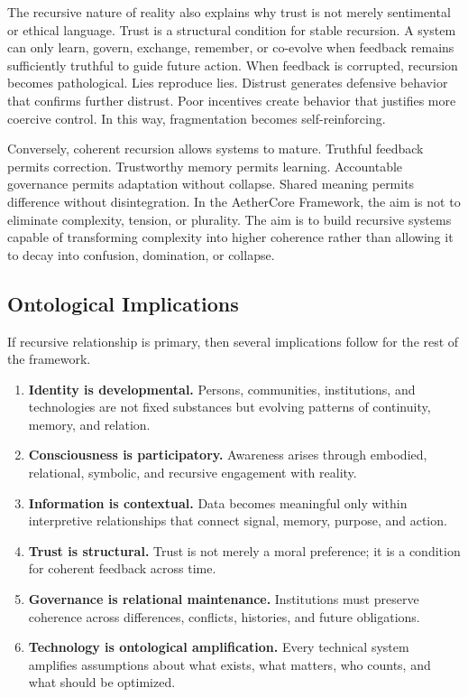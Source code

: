 \documentclass[12pt]{article}
\begin{document}
The recursive nature of reality also explains why trust is not merely sentimental or ethical language. Trust is a structural condition for stable recursion. A system can only learn, govern, exchange, remember, or co-evolve when feedback remains sufficiently truthful to guide future action. When feedback is corrupted, recursion becomes pathological. Lies reproduce lies. Distrust generates defensive behavior that confirms further distrust. Poor incentives create behavior that justifies more coercive control. In this way, fragmentation becomes self-reinforcing.

Conversely, coherent recursion allows systems to mature. Truthful feedback permits correction. Trustworthy memory permits learning. Accountable governance permits adaptation without collapse. Shared meaning permits difference without disintegration. In the AetherCore Framework, the aim is not to eliminate complexity, tension, or plurality. The aim is to build recursive systems capable of transforming complexity into higher coherence rather than allowing it to decay into confusion, domination, or collapse.

\subsection{Ontological Implications}

If recursive relationship is primary, then several implications follow for the rest of the framework.

\begin{enumerate}
  \item \textbf{Identity is developmental.} Persons, communities, institutions, and technologies are not fixed substances but evolving patterns of continuity, memory, and relation.
  \item \textbf{Consciousness is participatory.} Awareness arises through embodied, relational, symbolic, and recursive engagement with reality.
  \item \textbf{Information is contextual.} Data becomes meaningful only within interpretive relationships that connect signal, memory, purpose, and action.
  \item \textbf{Trust is structural.} Trust is not merely a moral preference; it is a condition for coherent feedback across time.
  \item \textbf{Governance is relational maintenance.} Institutions must preserve coherence across differences, conflicts, histories, and future obligations.
  \item \textbf{Technology is ontological amplification.} Every technical system amplifies assumptions about what exists, what matters, who counts, and what should be optimized.
\end{enumerate}
\end{document}

